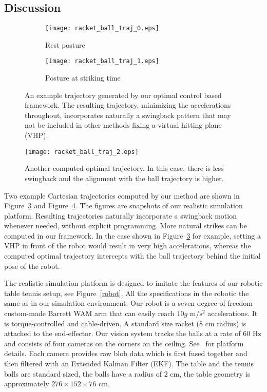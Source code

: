
\subsection{Discussion}

\begin{figure}
  \begin{subfigure}[b]{0.45\textwidth}
    \centering
    \texttt{[image: racket\_ball\_traj\_0.eps]}
    \caption{Rest posture}
    \label{fig:1}
  \end{subfigure}
  
  \begin{subfigure}[b]{0.45\textwidth}
  	\centering
    \texttt{[image: racket\_ball\_traj\_1.eps]}
    \caption{Posture at striking time}
    \label{fig:2}
  \end{subfigure}
  \caption{An example trajectory generated by our optimal control based framework. The resulting trajectory, minimizing the accelerations throughout, incorporates naturally a swingback pattern that may not be included in other methods fixing a virtual hitting plane (VHP).}
  \label{fig:0}
\end{figure}

\begin{figure}[t!]
\centering
\texttt{[image: racket\_ball\_traj\_2.eps]}	
\caption{Another computed optimal trajectory. In this case, there is less swingback and the alignment with the ball trajectory is higher.}
\label{fig:3}
\end{figure}

Two example Cartesian trajectories computed by our method are shown in Figure~\ref{fig:0} and Figure~\ref{fig:3}. The figures are snapshots of our realistic simulation platform. Resulting trajectories naturally incorporate a swingback motion whenever needed, without explicit programming. More natural strikes can be computed in our framework. In the case shown in Figure~\ref{fig:0} for example, setting a VHP in front of the robot would result in very high accelerations, whereas the computed optimal trajectory intercepts with the ball trajectory behind the initial pose of the robot.

The realistic simulation platform is designed to imitate the features of our robotic table tennis setup, see Figure~\ref{robot}. All the specifications in the robotic the same as in our simulation environment. Our robot is a seven degree of freedom custom-made Barrett WAM arm that can easily reach $10g$ m/$\textrm{s}^2$ accelerations. It is torque-controlled and cable-driven. A standard size racket ($8$ cm radius) is attached to the end-effector. Our vision system tracks the balls at a rate of $60$ Hz and consists of four cameras on the corners on the ceiling. See~\cite{Lampert12} for platform details. Each camera provides raw blob data which is first fused together and then filtered with an Extended Kalman Filter (EKF). The table and the tennis balls are standard sized, the balls have a radius of $2$ cm, the table geometry is approximately $276 \times 152 \times 76$ cm.

